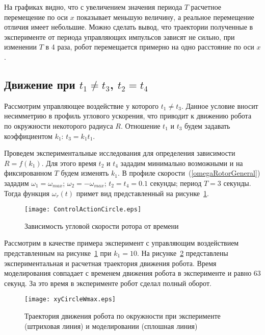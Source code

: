 На графиках видно, что с увеличением значения периода $ T $ расчетное перемещение по оси $ x $ показывает меньшую величину, а реальное перемещение отличия имеет небольшие. Можно сделать вывод, что траектории полученные в эксперименте от периода управляющих импульсов зависят не сильно, при изменении $ T $ в 4 раза, робот перемещается примерно на одно расстояние по оси $ x $.





\subsection{Движение при $ t_1 \neq t_3 $, $ t_2 = t_4 $ }

Рассмотрим управляющее воздействие у которого $ t_1 \neq t_3 $. Данное условие вносит несимметрию в профиль углового ускорения, что приводит к движению робота по окружности некоторого радиуса $ R $. Отношение $ t_1 $ и $t_3 $ будем задавать коэффициентом $ k_1 $: $ t_3 = k_1t_1 $.	

Проведем экспериментальные исследования для определения зависимости $ R = f(k_1) $. Для этого время $ t_2 $ и $ t_4 $ зададим минимально возможными и на фиксированном $ T $ будем изменять $k_1$. В профиле скорости~(\ref{omegaRotorGeneral}) зададим $ \omega_1 = \omega_{max} $; $ \omega_2 = -\omega_{max} $; $ t_2=t_4=0.1 $ секунды; период $ T = 3 $ секунды. Тогда функция $ \omega_r(t) $ примет вид представленный на рисунке~\ref{ControlActionCircle1}.

\begin{figure}[!ht]
	\centering
	\texttt{[image: ControlActionCircle.eps]}
	\caption{Зависимость угловой скорости ротора от времени}
	\label{ControlActionCircle1}
\end{figure}

Рассмотрим в качестве примера эксперимент с управляющим воздействием представленным на рисунке~\ref{ControlActionCircle1} при $ k_1 = 10 $. На рисунке~\ref{xyCircle1} представлены экспериментальная и расчетная траектория движения робота. Время моделирования совпадает с временем движения робота в эксперименте и равно 63 секунд. За это время в эксперименте робот сделал полный оборот.


\begin{figure}[!ht]
	\centering
	\texttt{[image: xyCircleWmax.eps]}
	\caption{Траектория движения робота по окружности при эксперименте (штриховая линия) и моделировании (сплошная линия)}
	\label{xyCircle1}
\end{figure}

